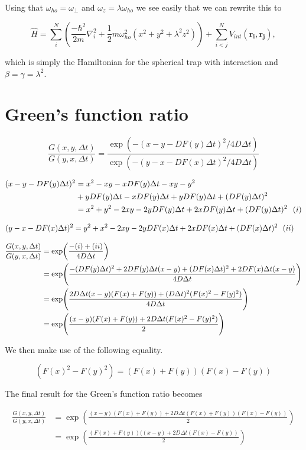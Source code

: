 Using that $\omega_{ho} = \omega_{\perp}$ and $\omega_z = \lambda \omega_{ho}$ we see easily that we can rewrite this to 

\begin{equation} \label{eq:elliptical}
\hat{H} = \sum_{i}^{N} \left( \frac{-\hbar^2}{2m} \nabla_i^2 + \frac{1}{2} m \omega_{ho}^2(x^2 + y^2 + \lambda^2 z^2) \right) + \sum_{i<j}^{N} V_{int}(\mathbf{r_i}, \mathbf{r_j}),
\end{equation}

which is simply the Hamiltonian for the spherical trap with interaction and $\beta = \gamma = \lambda^2$.

\section{Green's function ratio}

\begin{equation}
\frac{G(x,y,\Delta t)}{G(y,x,\Delta t)} = \frac{\exp(-(x - y - D F(y) \Delta t)^2 / 4D \Delta t)}{\exp(-(y - x - D F(x) \Delta t)^2 / 4D \Delta t)}
\end{equation}

\begin{align*}
(x - y - DF(y) \Delta t)^2 &= x^2 - xy - xDF(y) \Delta t - xy - y^2 \\
&+ yDF(y)\Delta t - xDF(y) \Delta t + yDF(y) \Delta t + (DF(y) \Delta t)^2 \\
&= x^2 + y^2 - 2xy - 2yDF(y) \Delta t + 2xDF(y) \Delta t + (DF(y) \Delta t)^2 \ \ (\romannumeral 1)
\end{align*}

\begin{align*}
(y - x - DF(x) \Delta t)^2 &= y^2 + x^2 - 2xy - 2yDF(x) \Delta t + 2xDF(x) \Delta t + (DF(x) \Delta t)^2 \ \ (\romannumeral 2)
\end{align*}

\begin{align*}
\frac{G(x,y,\Delta t)}{G(y,x,\Delta t)} &= \exp (\frac{-(\romannumeral 1) + (\romannumeral 2)}{4D \Delta t}) \\
&= \exp (\frac{-(DF(y) \Delta t)^2 + 2DF(y) \Delta t(x - y) + (DF(x) \Delta t)^2 + 2DF(x) \Delta t(x - y)}{4D \Delta t}) \\
&= \exp (\frac{2D\Delta t(x - y)(F(x) + F(y)) + (D \Delta t)^2 (F(x)^2 - F(y)^2)}{4D \Delta t}) \\
&= \exp (\frac{(x - y)(F(x) + F(y)) + 2D \Delta t(F(x)^2 - F(y)^2)}{2}) 
\end{align*}

We then make use of the following equality.

\begin{equation}
(F(x)^2 - F(y)^2) = (F(x) + F(y))(F(x) - F(y))
\end{equation}

The final result for the Green's function ratio becomes

\begin{align*}
\frac{G(x,y,\Delta t)}{G(y,x,\Delta t)} &= \exp (\frac{(x - y)(F(x) + F(y)) + 2D \Delta t(F(x) + F(y))(F(x) - F(y))}{2}) \\
&= \exp (\frac{(F(x) + F(y)) ((x - y) + 2D \Delta t (F(x) - F(y))}{2})
\end{align*}